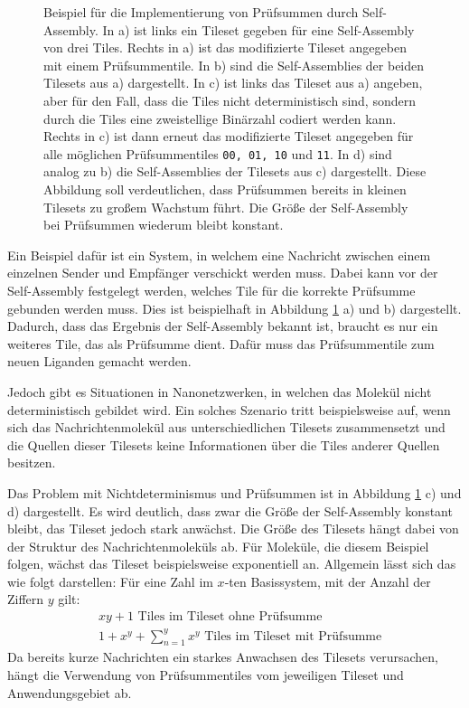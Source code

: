 \begin{figure}
\begin{tikzpicture}
    \end{tikzpicture}
    \caption[Checksum Beispiel]{Beispiel für die Implementierung von Prüfsummen durch Self-Assembly. In a) ist links ein Tileset gegeben für eine Self-Assembly von drei Tiles. Rechts in a) ist das modifizierte Tileset angegeben mit einem Prüfsummentile. In b) sind die Self-Assemblies der beiden Tilesets aus a) dargestellt. In c) ist links das Tileset aus a) angeben, aber für den Fall, dass die Tiles nicht deterministisch sind, sondern durch die Tiles eine zweistellige Binärzahl codiert werden kann. Rechts in c) ist dann erneut das modifizierte Tileset angegeben für alle möglichen Prüfsummentiles \texttt{00, 01, 10} und \texttt{11}. In d) sind analog zu b) die Self-Assemblies der Tilesets aus c) dargestellt. Diese Abbildung soll verdeutlichen, dass Prüfsummen bereits in kleinen Tilesets zu großem Wachstum führt. Die Größe der Self-Assembly bei Prüfsummen wiederum bleibt konstant.}
    \label{fig:checksum}
\end{figure}

Ein Beispiel dafür ist ein System, in welchem eine Nachricht zwischen einem einzelnen Sender und Empfänger verschickt werden muss. 
Dabei kann vor der Self-Assembly festgelegt werden, welches Tile für die korrekte Prüfsumme gebunden werden muss.
Dies ist beispielhaft in Abbildung \ref{fig:checksum} a) und b) dargestellt. 
Dadurch, dass das Ergebnis der Self-Assembly bekannt ist, braucht es nur ein weiteres Tile, das als Prüfsumme dient. 
Dafür muss das Prüfsummentile zum neuen Liganden gemacht werden.

Jedoch gibt es Situationen in Nanonetzwerken, in welchen das Molekül nicht deterministisch gebildet wird.  Ein solches Szenario tritt beispielsweise auf, wenn sich das Nachrichtenmolekül aus unterschiedlichen Tilesets zusammensetzt und die Quellen dieser Tilesets keine Informationen über die Tiles anderer Quellen besitzen. 

Das Problem mit Nichtdeterminismus und Prüfsummen ist in Abbildung \ref{fig:checksum} c) und d) dargestellt. 
Es wird deutlich, dass zwar die Größe der Self-Assembly konstant bleibt, das Tileset jedoch stark anwächst. Die Größe des Tilesets hängt dabei von der Struktur des Nachrichtenmoleküls ab. Für Moleküle, die diesem Beispiel folgen, wächst das Tileset beispielsweise exponentiell an. Allgemein lässt sich das wie folgt darstellen: Für eine Zahl im $x$-ten Basissystem, mit der Anzahl der Ziffern $y$ gilt:
\begin{align*}
    &xy+1 \text{ Tiles im Tileset ohne Prüfsumme}\\
    &1 + x^y + \sum_{n=1}^y x^y \text{ Tiles im Tileset mit Prüfsumme}
\end{align*}
Da bereits kurze Nachrichten ein starkes Anwachsen des Tilesets verursachen, hängt die Verwendung von Prüfsummentiles vom jeweiligen Tileset und Anwendungsgebiet ab.


